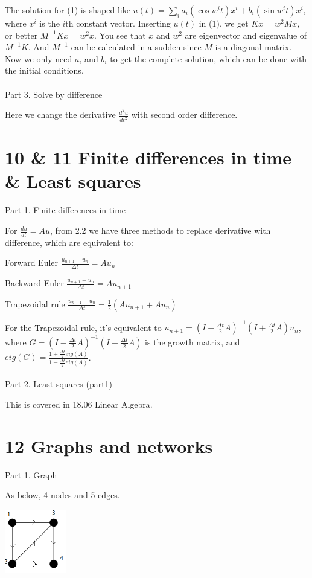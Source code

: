 \documentclass{article}
\begin{document}
\begin{spacing}{1.5}
The solution for (1) is shaped like $u(t)=\sum_i a_i (\cos w^it) x^i + b_i (\sin w^it) x^i$, where $x^i$ is the $i$th constant vector. Inserting $u(t)$ in (1), we get $Kx=w^2Mx$, or better $M^{-1}Kx=w^2x$. You see that $x$ and $w^2$ are eigenvector and eigenvalue of $M^{-1}K$. And $M^{-1}$ can be calculated in a sudden since $M$ is a diagonal matrix. Now we only need $a_i$ and $b_i$ to get the complete solution, which can be done with the initial conditions.
\\\\Part 3. Solve by difference

Here we change the derivative $\frac{d^2u}{dt^2}$ with second order difference.

\section*{10 \& 11 Finite differences in time \& Least squares}
Part 1. Finite differences in time

For $\frac{du}{dt}=Au$, from 2.2 we have three methods to replace derivative with difference, which are equivalent to: 

Forward Euler $\frac{u_{n+1}-u_n}{\Delta t}=Au_n$

Backward Euler $\frac{u_{n+1}-u_n}{\Delta t}=Au_{n+1}$

Trapezoidal rule $\frac{u_{n+1}-u_n}{\Delta t}=\frac{1}{2}(Au_{n+1}+Au_n)$

For the Trapezoidal rule, it's equivalent to $u_{n+1}=(I-\frac{\Delta t}{2}A)^{-1}(I+\frac{\Delta t}{2}A)u_n$, where $G=(I-\frac{\Delta t}{2}A)^{-1}(I+\frac{\Delta t}{2}A)$ is the growth matrix, and $eig(G)=\frac{1+\frac{\Delta t}{2} eig(A)}{1-\frac{\Delta t}{2} eig(A)}$.
\\\\ Part 2. Least squares (part1)

This is covered in 18.06 Linear Algebra.


\section*{12 Graphs and networks}
Part 1. Graph

As below, 4 nodes and 5 edges.  
\\\begin{center}
	\includegraphics[width=0.2\textwidth]{four_nodes_five_edges.png} \\ 
\end{center}


\end{spacing}
\end{document}
